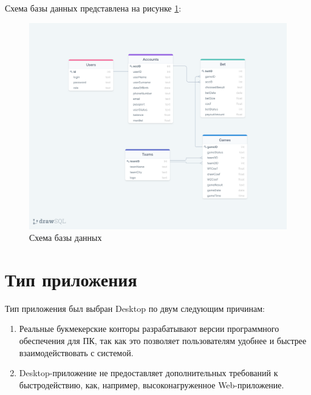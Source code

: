 \newpage

Схема базы данных представлена на рисунке \ref{fig::scheme}:
\FloatBarrier
\begin{figure}[hp]	
	\begin{center}
		\includegraphics[width=\linewidth]{inc/scheme.png}
	\end{center}
	\caption{Схема базы данных}
	\label{fig::scheme}
\end{figure}
\FloatBarrier

\section{Тип приложения}
Тип приложения был выбран Desktop по двум следующим причинам:
\begin{enumerate}
	\item Реальные букмекерские конторы разрабатывают версии программного обеспечения для ПК, так как это позволяет пользователям удобнее и быстрее взаимодействовать с системой.
	\item Desktop-приложение не предоставляет дополнительных требований к быстродействию, как, например, высоконагруженное Web-приложение. 
\end{enumerate}

